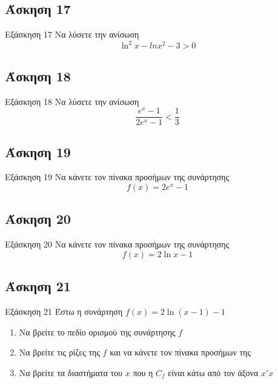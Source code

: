 \documentclass[greek]{beamer}
\begin{document}
\subsection{Άσκηση 17}
\begin{frame}[label=Άσκηση17,t]{Εξάσκηση 17}
  Να λύσετε την ανίσωση
  $$\ln^2x-ln x^2-3>0$$

\end{frame}

\subsection{Άσκηση 18}
\begin{frame}[label=Άσκηση18,t]{Εξάσκηση 18}
  Να λύσετε την ανίσωση $$\dfrac{e^x-1}{2e^x-1}<\dfrac{1}{3}$$

\end{frame}

\subsection{Άσκηση 19}
\begin{frame}[label=Άσκηση19,t]{Εξάσκηση 19}
  Να κάνετε τον πίνακα προσήμων της συνάρτησης $$f(x)=2e^x-1$$

\end{frame}

\subsection{Άσκηση 20}
\begin{frame}[label=Άσκηση20,t]{Εξάσκηση 20}
  Να κάνετε τον πίνακα προσήμων της συνάρτησης $$f(x)=2\ln x-1$$

\end{frame}

\subsection{Άσκηση 21}
\begin{frame}[label=Άσκηση21,t]{Εξάσκηση 21}
  Έστω η συνάρτηση $f(x)=2\ln (x-1)-1$
  \begin{enumerate}
    \item<1-> Να βρείτε το πεδίο ορισμού της συνάρτησης $f$
    \item<2-> Να βρείτε τις ρίζες της $f$ και να κάνετε τον πίνακα προσήμων της
    \item<3-> Να βρείτε τα διαστήματα του $x$ που η $C_f$ είναι κάτω από τον άξονα $x'x$
  \end{enumerate}

\end{frame}
\end{document}
